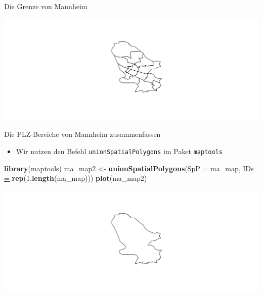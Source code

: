\documentclass[ignorenonframetext,]{beamer}
\newenvironment{Shaded}{\begin{snugshade}}{\end{snugshade}}
\newcommand{\DataTypeTok}[1]{\textcolor[rgb]{0.74,0.68,0.62}{\underline{#1}}}
\newcommand{\DecValTok}[1]{\textcolor[rgb]{0.27,0.67,0.26}{#1}}
\newcommand{\KeywordTok}[1]{\textcolor[rgb]{0.26,0.66,0.93}{\textbf{#1}}}
\newcommand{\NormalTok}[1]{\textcolor[rgb]{0.74,0.68,0.62}{#1}}
\newcommand{\OperatorTok}[1]{\textcolor[rgb]{0.74,0.68,0.62}{#1}}
\newcommand{\StringTok}[1]{\textcolor[rgb]{0.02,0.61,0.04}{#1}}
\providecommand{\tightlist}{%
  \setlength{\itemsep}{0pt}\setlength{\parskip}{0pt}}
\begin{document}
\begin{frame}[fragile]{Die Grenze von Mannheim}
\protect\hypertarget{die-grenze-von-mannheim}{}

\begin{Shaded}
\end{Shaded}

\includegraphics{Geomedizin_files/figure-beamer/unnamed-chunk-118-1.pdf}

\end{frame}

\begin{frame}[fragile]{Die PLZ-Bereiche von Mannheim zusammenfassen}
\protect\hypertarget{die-plz-bereiche-von-mannheim-zusammenfassen}{}

\begin{itemize}
\tightlist
\item
  Wir nutzen den Befehl \texttt{unionSpatialPolygons} im Paket
  \texttt{maptools}
\end{itemize}

\begin{Shaded}
\begin{Highlighting}[]
\KeywordTok{library}\NormalTok{(maptools)}
\NormalTok{ma_map2 <-}\StringTok{ }\KeywordTok{unionSpatialPolygons}\NormalTok{(}\DataTypeTok{SpP =}\NormalTok{ ma_map,}
                                \DataTypeTok{IDs =} \KeywordTok{rep}\NormalTok{(}\DecValTok{1}\NormalTok{,}\KeywordTok{length}\NormalTok{(ma_map)))}
\KeywordTok{plot}\NormalTok{(ma_map2)}
\end{Highlighting}
\end{Shaded}

\includegraphics{Geomedizin_files/figure-beamer/unnamed-chunk-119-1.pdf}

\end{frame}
\end{document}
